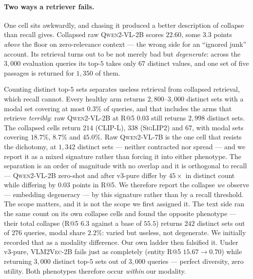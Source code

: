 \paragraph{Two ways a retriever fails.} One cell sits awkwardly, and chasing it produced a
better description of collapse than recall gives. Collapsed raw \textsc{Qwen2-VL-2B} scores
$22.60$, some $3.3$ points \emph{above} the floor on zero-relevance context --- the wrong side
for an ``ignored junk'' account. Its retrieval turns out to be not merely bad but
\emph{degenerate}: across the $3{,}000$ evaluation queries its top-$5$ takes only $67$ distinct
values, and one set of five passages is returned for $1{,}350$ of them.

Counting distinct top-$5$ sets separates useless retrieval from collapsed retrieval, which recall
cannot. Every healthy arm returns $2{,}800$--$3{,}000$ distinct sets with a modal set covering at
most $0.3\%$ of queries, and that includes the arms that retrieve \emph{terribly}: raw
\textsc{Qwen2-VL-2B} at R@5 $0.03$ still returns $2{,}998$ distinct sets. The collapsed
cells return $214$ (\textsc{CLIP-L}), $338$ (\textsc{SigLIP2}) and $67$, with modal sets covering
$18.7\%$, $8.7\%$ and $45.0\%$. Raw \textsc{Qwen2-VL-7B} is the one cell that resists the
dichotomy, at $1{,}342$ distinct sets --- neither contracted nor spread --- and we report it as
a mixed signature rather than forcing it into either phenotype. The separation is an order of magnitude with no overlap and it is
orthogonal to recall --- \textsc{Qwen2-VL-2B} zero-shot and after v3-pure differ by $45\times$ in
distinct count while differing by $0.03$ points in R@5. We therefore report the collapse \emph{we} observe --- embedding
degeneracy --- by this signature rather than by a recall threshold. The scope matters, and it is not the scope we
first assigned it. The text side ran the same count on its own collapse cells and found the
opposite phenotype --- their total collapse (R@5 $6.3$ against a base of $55.5$) returns $242$
distinct sets out of $276$ queries, modal share $2.2\%$: varied but useless, not degenerate. We
initially recorded that as a modality difference. Our own ladder then falsified it. Under
v3-pure, \textsc{VLM2Vec-2B} fails just as completely (entity R@5 $15.67 \to 0.70$) while
returning $3{,}000$ distinct top-$5$ sets out of $3{,}000$ queries --- perfect diversity, zero
utility. Both phenotypes therefore occur \emph{within} our modality.

